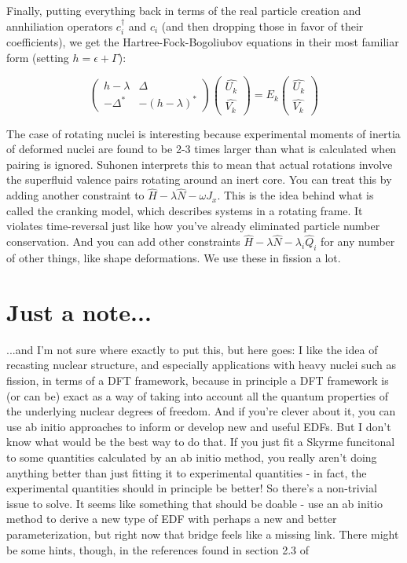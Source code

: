 Finally, putting everything back in terms of the real particle creation and annhiliation operators $c_i^\dagger$ and $c_i$ (and then dropping those in favor of their coefficients), we get the Hartree-Fock-Bogoliubov equations in their most familiar form (setting $h=\epsilon+\Gamma$):

\begin{equation}
\left(\begin{array}{cc}
h-\lambda & \Delta \\
-\Delta^* & -(h-\lambda)^*
\end{array}\right) \left(\begin{array}{c}
\hat{U_k} \\
\hat{V_k}
\end{array}\right)
= E_k\left(\begin{array}{c}
\hat{U_k} \\
\hat{V_k}
\end{array}\right)
\end{equation}

The case of rotating nuclei is interesting because experimental moments of inertia of deformed nuclei are found to be 2-3 times larger than what is calculated when pairing is ignored. Suhonen interprets this to mean that actual rotations involve the superfluid valence pairs rotating around an inert core. You can treat this by adding another constraint to $\hat{H} - \lambda\hat{N} - \omega J_x$. This is the idea behind what is called the cranking model, which describes systems in a rotating frame. It violates time-reversal just like how you've already eliminated particle number conservation. And you can add other constraints $\hat{H} - \lambda\hat{N} - \lambda_i \hat{Q}_i$ for any number of other things, like shape deformations. We use these in fission a lot.

\section*{Just a note...}
...and I'm not sure where exactly to put this, but here goes: I like the idea of recasting nuclear structure, and especially applications with heavy nuclei such as fission, in terms of a DFT framework, because in principle a DFT framework is (or can be) exact as a way of taking into account all the quantum properties of the underlying nuclear degrees of freedom. And if you're clever about it, you can use ab initio approaches to inform or develop new and useful EDFs. But I don't know what would be the best way to do that. If you just fit a Skyrme funcitonal to some quantities calculated by an ab initio method, you really aren't doing anything better than just fitting it to experimental quantities - in fact, the experimental quantities should in principle be better! So there's a non-trivial issue to solve. It seems like something that should be doable - use an ab initio method to derive a new type of EDF with perhaps a new and better parameterization, but right now that bridge feels like a missing link. There might be some hints, though, in the references found in section 2.3 of \cite{Schunck2015error_analysis}

%

